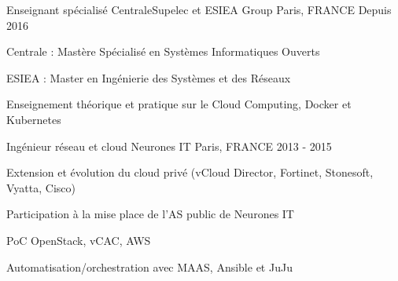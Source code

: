 \begin{cventries}
  \cventry
    {Enseignant spécialisé} %
    {CentraleSupelec et ESIEA Group}
    {Paris, FRANCE} %
    {Depuis 2016} %
    {
      \begin{cvitems} %
      \item {Centrale : Mastère Spécialisé en Systèmes Informatiques Ouverts}
      \item {ESIEA : Master en Ingénierie des Systèmes et des Réseaux}
      \item {Enseignement théorique et pratique sur le Cloud Computing, Docker et Kubernetes}
      \end{cvitems}
    }
  \cventry
    {Ingénieur réseau et cloud}
    {Neurones IT} %
    {Paris, FRANCE} %
    {2013 - 2015} %
    {
      \begin{cvitems} %
      \item {Extension et évolution du cloud privé (vCloud Director, Fortinet, Stonesoft, Vyatta, Cisco)}
      \item {Participation à la mise place de l'AS public de Neurones IT}
      \item {PoC OpenStack, vCAC, AWS}
      \item {Automatisation/orchestration avec MAAS, Ansible et JuJu}
      \end{cvitems}
    }

\end{cventries}
